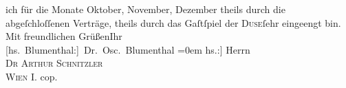 \begin{ledgroupsized}[t]{13cm}
               ich für die Monate Oktober, November, Dezember
               theils durch die abgeſchloſſenen Verträge, theils durch das Gaſtſpiel der \textsc{Duse}ſehr eingeengt bin.\pend
           \pstart
           Mit freundlichen Grüßen\hspace*{2.5em}Ihr{\\[\baselineskip]}\spacefill\mbox{{[}hs. Blumenthal:{]} Dr. Osc. Blumenthal}\pend
           \leftskip=0em{}\pstart
           \noindent{}{[}hs.:{]} Herrn{\\}\textsc{Dr Arthur Schnitzler}{\\}\textsc{Wien I.}\pend
           \pstart
           cop.\pend
           
         
         \endnumbering{}\end{ledgroupsized}  \newcommand{\dateiname}{L00110}\newcommand{\titel}{Oscar Blumenthal an Arthur Schnitzler, 1. 8. 1892}\newcommand{\editorInnen}{Martin Anton Müller und Gerd-Hermann Susen}
      